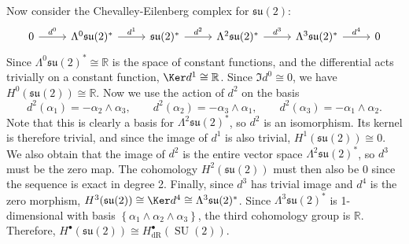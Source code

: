 \documentclass[11pt, letterpaper]{article}
\theoremstyle{plain}
\begin{document}
Now consider the Chevalley-Eilenberg complex for $\mathfrak{su} (2)$:
\[\begin{tikzcd}[row sep = 2.5em, column sep = 2.5em]
	0\ar[" d^{0}  ", r]  & \Lambda ^0\mathfrak{su} (2)^*\ar[" d^1 ", r]  & \mathfrak{su} (2)^*\ar[" d^2 ", r]  & \Lambda ^2\mathfrak{su} (2)^*\ar[" d^3 ", r]  & \Lambda ^3\mathfrak{su} (2)^*\ar[" d^4", r] & 0
\end{tikzcd}\]
Since $\Lambda ^0\mathfrak{su} (2)^*\cong \mathbb{R} $ is the space of constant functions, and the differential acts trivially on a constant function, $\Ker d^1 \cong \mathbb{R} $. Since $\Im d^{0} \cong 0$, we have $H^0(\mathfrak{su} (2))\cong \mathbb{R} $. Now we use the action of $d^2$ on the basis
\[
	d^2(\alpha _1) = -\alpha _2 \wedge \alpha _3,\qquad d^2(\alpha _2) = -\alpha _3 \wedge \alpha _1,\qquad d^2(\alpha_3) = -\alpha _1 \wedge \alpha _2
.\]
Note that this is clearly a basis for $\Lambda ^2 \mathfrak{su}(2)^*$, so $d^2$ is an isomorphism. Its kernel is therefore trivial, and since the image of $d^1$ is also trivial, $H^1(\mathfrak{su} (2))\cong 0$. We also obtain that the image of $d^2$ is the entire vector space $\Lambda ^2\mathfrak{su} (2)^*$, so $d^3$ must be the zero map. The cohomology $H^2(\mathfrak{su} (2))$ must then also be 0 since the sequence is exact in degree 2. Finally, since $d^3$ has trivial image and $d^4$ is the zero morphism, $H^3(\mathfrak{su} (2))\cong \Ker d^4 \cong \Lambda ^3 \mathfrak{su} (2)^*$. Since $\Lambda ^3\mathfrak{su} (2)^*$ is 1-dimensional with basis $\left\{ \alpha _1 \wedge \alpha _2\wedge \alpha _3 \right\} $, the third cohomology group is $\mathbb{R} $. Therefore, $H^{\bullet} (\mathfrak{su} (2))\cong H^{\bullet}_{\mathrm{dR} } (\operatorname{SU} (2))$.
\end{document}
